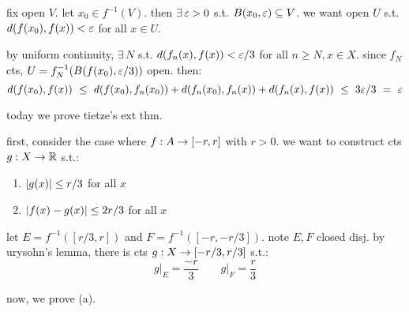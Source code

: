 \begin{pf}[source=Primary Source Material]
    fix open $V$. let $x_{0}\in f^{-1}(V)$.
    then $\exists \, \varepsilon>0$ s.t. $B(x_{0},\varepsilon)\subseteq V$.
    we want open $U$ s.t. $d(f(x_{0}),f(x))<\varepsilon$ for all $x\in U$.

    by uniform continuity, $\exists \, N$ s.t. $d(f_{n}(x),f(x))<\varepsilon/3$ for all
    $n\geq N,x\in X$.
    since $f_{N}$ cts, $U=f_{N}^{-1}(B(f(x_{0}),\varepsilon/3))$ open. then:
    \begin{equation*}
        d(f(x_{0}),f(x)) \ \leq \
        d(f(x_{0}),f_{n}(x_{0})) + d(f_{n}(x_{0}),f_{n}(x)) + d(f_{n}(x),f(x))
        \ \leq \ 3\varepsilon/3 \ = \ \varepsilon
    \end{equation*} \vspace{-6mm}
\end{pf}

today we prove tietze's ext thm.

first, consider the case where $f:A\rightarrow[-r,r]$ with $r>0$.
we want to construct cts $g:X\rightarrow\mathbb{R}$ s.t.:
\begin{enumerate}[(1)]
    \item $\abs{g(x)}\leq r/3$ for all $x$
    \item $\abs{f(x)-g(x)}\leq 2r/3$ for all $x$
\end{enumerate}
\begin{block}
    let $E=f^{-1}([r/3,r])$ and $F=f^{-1}([-r,-r/3])$. note $E,F$ closed disj.
    by urysohn's lemma, there is cts $g:X\rightarrow[-r/3,r/3]$ s.t.:
    \begin{equation*}
        g\rvert_{E}=\frac{-r}{3} \qquad g\rvert_{F}=\frac{r}{3}
    \end{equation*}
\end{block}
now, we prove (a).

